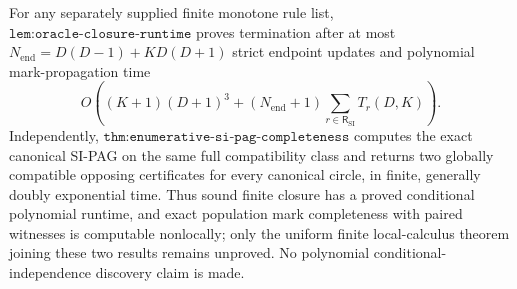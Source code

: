 For any separately supplied finite monotone rule list, \(\texttt{lem:oracle-closure-runtime}\) proves termination after at most \(N_{\mathrm{end}}=D(D-1)+KD(D+1)\) strict endpoint updates and polynomial mark-propagation time \[O\!\left((K+1)(D+1)^3+(N_{\mathrm{end}}+1)\sum_{r\in\mathsf R_{\mathrm{SI}}}T_r(D,K)\right).\] Independently, \(\texttt{thm:enumerative-si-pag-completeness}\) computes the exact canonical SI-PAG on the same full compatibility class and returns two globally compatible opposing certificates for every canonical circle, in finite, generally doubly exponential time.  Thus sound finite closure has a proved conditional polynomial runtime, and exact population mark completeness with paired witnesses is computable nonlocally; only the uniform finite local-calculus theorem joining these two results remains unproved.  No polynomial conditional-independence discovery claim is made.